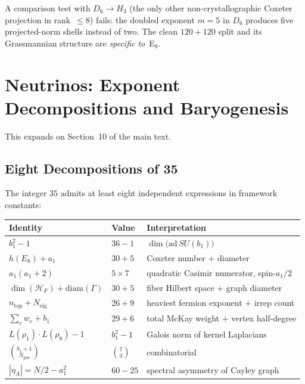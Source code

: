 \documentclass[12pt,a4paper]{article}
\theoremstyle{definition}
\begin{document}
A comparison test with $D_6 \to H_3$ (the only other non-crystallographic Coxeter projection in rank~$\leq 8$) fails: the doubled exponent $m = 5$ in $D_6$ produces five projected-norm shells instead of two.  The clean $120 + 120$ split and its Grassmannian structure are \emph{specific to}~E$_8$.


\section{Neutrinos: Exponent Decompositions and Baryogenesis}
\label{sec:S-neutrinos}

This expands on Section~10 of the main text.

\subsection{Eight Decompositions of 35}

The integer $35$ admits at least eight independent expressions in framework constants:
\begin{center}
\begin{tabular}{lll}
\toprule
\textbf{Identity} & \textbf{Value} & \textbf{Interpretation} \\
\midrule
$b_1^2 - 1$ & $36 - 1$ & $\dim\bigl(\mathrm{ad}\,SU(b_1)\bigr)$ \\
$h(E_8) + a_1$ & $30 + 5$ & Coxeter number $+$ diameter \\
$a_1(a_1 + 2)$ & $5 \times 7$ & quadratic Casimir numerator, spin-$a_1/2$ \\
$\dim(\mathcal{H}_F) + \mathrm{diam}(\Gamma)$ & $30 + 5$ & fiber Hilbert space $+$ graph diameter \\
$n_{\text{top}} + N_{\text{eig}}$ & $26 + 9$ & heaviest fermion exponent $+$ irrep count \\
$\displaystyle\sum_e w_e + b_1$ & $29 + 6$ & total McKay weight $+$ vertex half-degree \\
$L(\rho_1)\cdot L(\rho_8) - 1$ & $b_1^2 - 1$ & Galois norm of kernel Laplacians \\
$\binom{b_1+1}{N_{\text{gen}}}$ & $\binom{7}{3}$ & combinatorial \\
$|\eta_A| = N/2 - a_1^2$ & $60 - 25$ & spectral asymmetry of Cayley graph \\
\bottomrule
\end{tabular}
\end{center}
\end{document}
